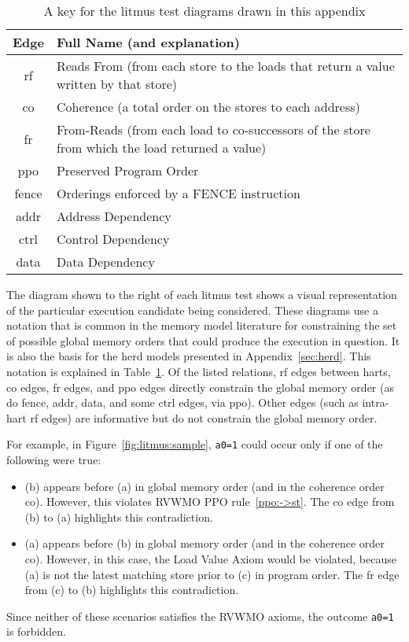 \begin{table}[h]
  \centering\small
  \begin{tabular}{|c|l|}
    \hline
    Edge & Full Name (and explanation) \\
    \hline
    \sf rf   & Reads From (from each store to the loads that return a value written by that store) \\
    \hline
    \sf co   & Coherence (a total order on the stores to each address) \\
    \hline
    \sf fr   & From-Reads (from each load to co-successors of the store from which the load returned a value) \\
    \hline
    \sf ppo  & Preserved Program Order \\
    \hline
    \sf fence & Orderings enforced by a FENCE instruction \\
    \hline
    \sf addr & Address Dependency \\
    \hline
    \sf ctrl & Control Dependency \\
    \hline
    \sf data & Data Dependency \\
    \hline
  \end{tabular}
  \caption{A key for the litmus test diagrams drawn in this appendix}
  \label{tab:litmus:key}
\end{table}

The diagram shown to the right of each litmus test shows a visual representation of the particular execution candidate being considered.
These diagrams use a notation that is common in the memory model literature for constraining the set of possible global memory orders that could produce the execution in question.
It is also the basis for the \textsf{herd} models presented in Appendix~\ref{sec:herd}.
This notation is explained in Table~\ref{tab:litmus:key}.
Of the listed relations, {\sf rf} edges between harts, {\sf co} edges, {\sf fr} edges, and {\sf ppo} edges directly constrain the global memory order (as do {\sf fence}, {\sf addr}, {\sf data}, and some {\sf ctrl} edges, via {\sf ppo}).
Other edges (such as intra-hart {\sf rf} edges) are informative but do not constrain the global memory order.

For example, in Figure~\ref{fig:litmus:sample}, {\tt a0=1} could occur only if one of the following were true:
\begin{itemize}
  \item (b) appears before (a) in global memory order (and in the coherence order {\sf co}).  However, this violates RVWMO PPO rule~\ref{ppo:->st}.  The {\sf co} edge from (b) to (a) highlights this contradiction.
  \item (a) appears before (b) in global memory order (and in the coherence order {\sf co}).  However, in this case, the Load Value Axiom would be violated, because (a) is not the latest matching store prior to (c) in program order.  The {\sf fr} edge from (c) to (b) highlights this contradiction.
\end{itemize}
Since neither of these scenarios satisfies the RVWMO axioms, the outcome {\tt a0=1} is forbidden.

